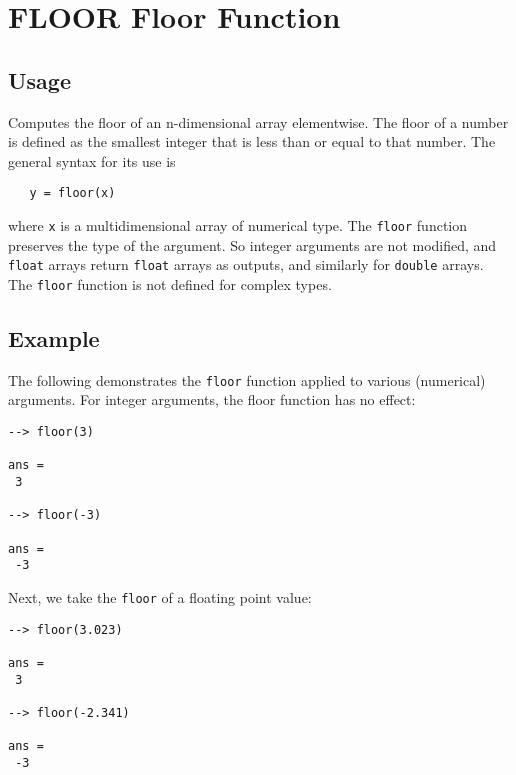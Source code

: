 \section{FLOOR Floor Function}

\subsection{Usage}

Computes the floor of an n-dimensional array elementwise.  The
floor of a number is defined as the smallest integer that is
less than or equal to that number. The general syntax for its use
is
\begin{verbatim}
   y = floor(x)
\end{verbatim}
where \verb|x| is a multidimensional array of numerical type.  The \verb|floor| 
function preserves the type of the argument.  So integer arguments 
are not modified, and \verb|float| arrays return \verb|float| arrays as 
outputs, and similarly for \verb|double| arrays.  The \verb|floor| function 
is not defined for complex types.
\subsection{Example}

The following demonstrates the \verb|floor| function applied to various
(numerical) arguments.  For integer arguments, the floor function has
no effect:
\begin{verbatim}
--> floor(3)

ans = 
 3 

--> floor(-3)

ans = 
 -3 
\end{verbatim}
Next, we take the \verb|floor| of a floating point value:
\begin{verbatim}
--> floor(3.023)

ans = 
 3 

--> floor(-2.341)

ans = 
 -3 
\end{verbatim}
